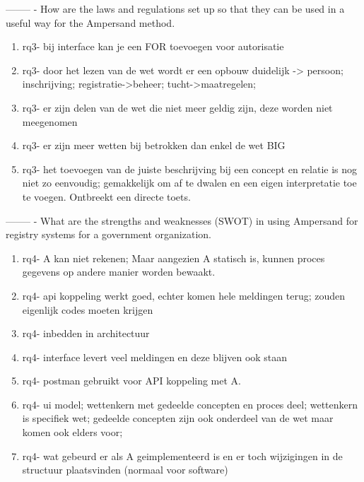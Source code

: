 --------
\newline
[RQ3]- How are the laws and regulations set up so that they can be used in a useful way for the Ampersand method.
\begin{enumerate}
    \item rq3- bij interface kan je een FOR toevoegen voor autorisatie
    \item rq3- door het lezen van de wet wordt er een opbouw duidelijk -> persoon; inschrijving; registratie->beheer; tucht->maatregelen; 
    \item rq3- er zijn delen van de wet die niet meer geldig zijn, deze worden niet meegenomen
    \item rq3- er zijn meer wetten bij betrokken dan enkel de wet BIG
    \item rq3- het toevoegen van de juiste beschrijving bij een concept en relatie is nog niet zo eenvoudig; gemakkelijk om af te dwalen en een eigen interpretatie toe te voegen. Ontbreekt een directe toets.
\end{enumerate}
--------
\newline
[RQ4]- What are the strengths and weaknesses (SWOT) in using Ampersand for registry systems for a government organization.
\begin{enumerate}
    \item rq4- A kan niet rekenen; Maar aangezien A statisch is, kunnen proces gegevens op andere manier worden bewaakt.
    \item rq4- api koppeling werkt goed, echter komen hele meldingen terug; zouden eigenlijk codes moeten krijgen 
    \item rq4- inbedden in architectuur 
    \item rq4- interface levert veel meldingen en deze blijven ook staan
    \item rq4- postman gebruikt voor API koppeling met A. 
    \item rq4- ui model; wettenkern met gedeelde concepten en proces deel; wettenkern is specifiek wet; gedeelde concepten zijn ook onderdeel van de wet maar komen ook elders voor;
    \item rq4- wat gebeurd er als A geimplementeerd is en er toch wijzigingen in de structuur plaatsvinden (normaal voor software)
\end{enumerate}
